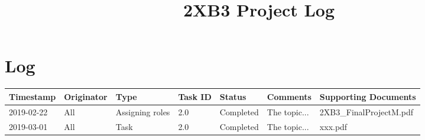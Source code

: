 \documentclass[12pt]{article}
\begin{document}
\title{2XB3 Project Log}
\maketitle

\section{Log}


 \begin{tabular}{|p{2cm}| p{2cm}| p{2cm}| p{2cm}| p{2cm}| p{2cm}| p{2cm}|} 
 \hline
Timestamp & Originator & Type & Task ID & Status & Comments & Supporting Documents   \\  
 \hline
 2019-02-22 & All & Assigning roles & 2.0 & Completed & The topic... & 2XB3_FinalProjectM.pdf  \\
 \hline
 2019-03-01 & All & Task & 2.0 & Completed & The topic... & xxx.pdf  \\
 \hline

 
\end{tabular}
\end{document}
